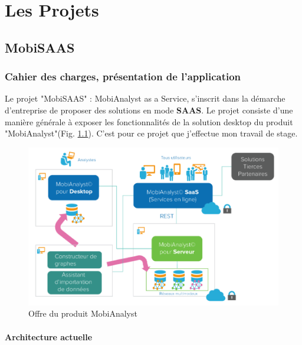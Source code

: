 \chapter{Les Projets}
\label{Developpement}

\section{MobiSAAS}

\subsection{Cahier des charges, présentation de l'application}

Le projet "MobiSAAS" : MobiAnalyst as a Service, s'inscrit dans la démarche d'entreprise de proposer des solutions en mode \textbf{SAAS}. Le projet consiste d'une manière générale à exposer les fonctionnalités de la solution desktop du produit "MobiAnalyst"(Fig. \ref{OffreMobiAnalyst}). C'est pour ce projet que j'effectue mon travail de stage.\\

\begin{figure}[!h]
\centering
\includegraphics[width=14cm]{images/offre_MobiAnalyst.png}
\caption{\label{OffreMobiAnalyst}Offre du produit MobiAnalyst}
\end{figure} 

\subsubsection{Architecture actuelle}


